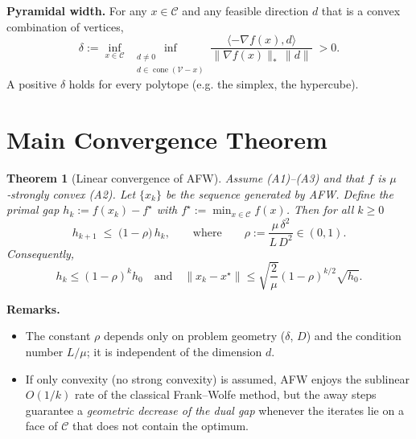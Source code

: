 \documentclass{article}
\newtheorem{theorem}{Theorem}
\begin{document}
\noindent\textbf{Pyramidal width.}
For any $x\in\mathcal C$ and any feasible direction $d$ that is a convex
combination of vertices,
\[
\delta := \inf_{x\in\mathcal C}\;\inf_{\substack{d\neq0\\ d\in\operatorname{cone}(\mathcal V-x)}}
\frac{\langle -\nabla f(x),d\rangle}
{\|\nabla f(x)\|_*\,\|d\|}\;>0 .
\]
A positive $\delta$ holds for every polytope (e.g. the simplex, the hypercube).

\section*{Main Convergence Theorem}
\begin{theorem}[Linear convergence of AFW]\label{thm:linear}
Assume (A1)–(A3) and that $f$ is $\mu$‑strongly convex (A2). Let $\{x_k\}$ be the
sequence generated by AFW. Define the primal gap $h_k:=f(x_k)-f^\star$
with $f^\star:=\min_{x\in\mathcal C}f(x)$. Then for all $k\ge0$
\[
h_{k+1}\;\le\;\bigl(1-\rho\bigr)\,h_{k},
\qquad\text{where}\qquad
\rho:=\frac{\mu\,\delta^{2}}{L\,D^{2}}\in(0,1).
\tag{T1}
\]
Consequently,
\[
h_{k}\le (1-\rho)^{k}h_{0}\quad\text{and}\quad
\|x_k-x^\star\|\le\sqrt{\frac{2}{\mu}}(1-\rho)^{k/2}\sqrt{h_{0}} .
\tag{T2}
\]
\end{theorem}

\noindent\textbf{Remarks.}
\begin{itemize}
\item The constant $\rho$ depends only on problem geometry ($\delta$, $D$) and
the condition number $L/\mu$; it is independent of the dimension $d$.
\item If only convexity (no strong convexity) is assumed, AFW enjoys the
sublinear $O(1/k)$ rate of the classical Frank–Wolfe method, but the
away steps guarantee a \emph{geometric decrease of the dual gap} whenever
the iterates lie on a face of $\mathcal C$ that does not contain the optimum.
\end{itemize}
\end{document}
